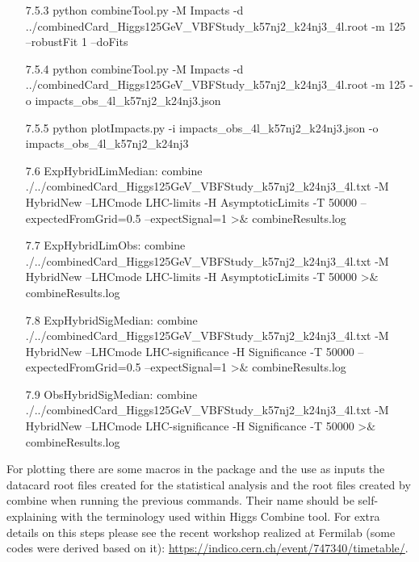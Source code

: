 \documentclass[]{report}
\begin{document}
\begin{itemize}
\item[7.5.3] python combineTool.py -M Impacts -d ../combinedCard\_Higgs125GeV\_VBFStudy\_k57nj2\_k24nj3\_4l.root -m 125 --robustFit 1 --doFits
\item[7.5.4] python combineTool.py -M Impacts -d ../combinedCard\_Higgs125GeV\_VBFStudy\_k57nj2\_k24nj3\_4l.root -m 125 -o impacts\_obs\_4l\_k57nj2\_k24nj3.json
\item[7.5.5] python plotImpacts.py -i impacts\_obs\_4l\_k57nj2\_k24nj3.json -o impacts\_obs\_4l\_k57nj2\_k24nj3
\item[7.6] ExpHybridLimMedian: combine ./../combinedCard\_Higgs125GeV\_VBFStudy\_k57nj2\_k24nj3\_4l.txt -M HybridNew --LHCmode LHC-limits -H AsymptoticLimits -T 50000 --expectedFromGrid=0.5 --expectSignal=1 >$\&$ combineResults.log
\item[7.7] ExpHybridLimObs: combine ./../combinedCard\_Higgs125GeV\_VBFStudy\_k57nj2\_k24nj3\_4l.txt -M HybridNew --LHCmode LHC-limits -H AsymptoticLimits -T 50000 >$\&$ combineResults.log
\item[7.8] ExpHybridSigMedian: combine ./../combinedCard\_Higgs125GeV\_VBFStudy\_k57nj2\_k24nj3\_4l.txt -M HybridNew --LHCmode LHC-significance -H Significance -T 50000 --expectedFromGrid=0.5 --expectSignal=1 >$\&$ combineResults.log
\item[7.9] ObsHybridSigMedian: combine ./../combinedCard\_Higgs125GeV\_VBFStudy\_k57nj2\_k24nj3\_4l.txt -M HybridNew --LHCmode LHC-significance -H Significance -T 50000 >$\&$ combineResults.log	
\end{itemize}

For plotting there are some macros in the package and the use as inputs the datacard root files created for the statistical analysis and the root files created by combine when running the previous commands. Their name should be self-explaining with the terminology used within Higgs Combine tool. For extra details on this steps please see the recent workshop realized at Fermilab (some codes were derived based on it): \url{https://indico.cern.ch/event/747340/timetable/}.


\appendix
\end{document}
